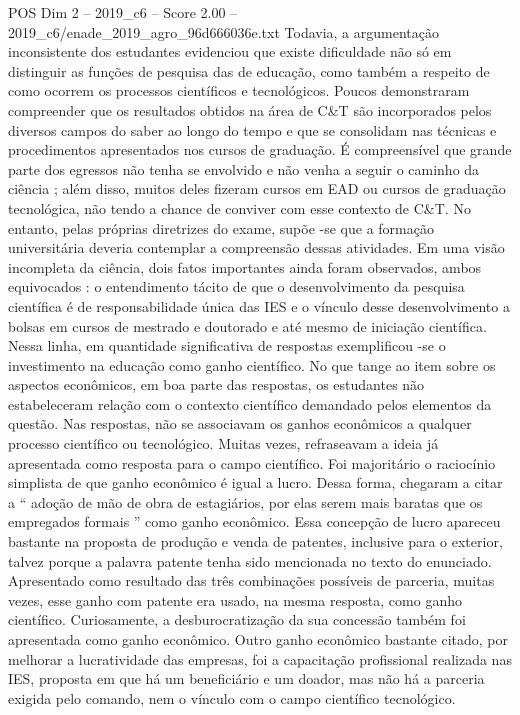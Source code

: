 \begin{textsample}{POS Dim 2 – 2019\_c6 – Score 2.00 – 2019\_c6/enade\_2019\_agro\_96d666036e.txt}
Todavia, a argumentação inconsistente dos estudantes evidenciou que existe dificuldade não só em distinguir as funções de pesquisa das de educação, como também a respeito de como ocorrem os processos científicos e tecnológicos.
Poucos demonstraram compreender que os resultados obtidos na área de C\&T são incorporados pelos diversos campos do saber ao longo do tempo e que se consolidam nas técnicas e procedimentos apresentados nos cursos de graduação.
É compreensível que grande parte dos egressos não tenha se envolvido e não venha a seguir o caminho da ciência ; além disso, muitos deles fizeram cursos em EAD ou cursos de graduação tecnológica, não tendo a chance de conviver com esse contexto de C\&T.
No entanto, pelas próprias diretrizes do exame, supõe -se que a formação universitária deveria contemplar a compreensão dessas atividades.
Em uma visão incompleta da ciência, dois fatos importantes ainda foram observados, ambos equivocados : o entendimento tácito de que o desenvolvimento da pesquisa científica é de responsabilidade única das IES e o vínculo desse desenvolvimento a bolsas em cursos de mestrado e doutorado e até mesmo de iniciação científica.
Nessa linha, em quantidade significativa de respostas exemplificou -se o investimento na educação como ganho científico.
No que tange ao item sobre os aspectos econômicos, em boa parte das respostas, os estudantes não estabeleceram relação com o contexto científico demandado pelos elementos da questão.
Nas respostas, não se associavam os ganhos econômicos a qualquer processo científico ou tecnológico.
Muitas vezes, refraseavam a ideia já apresentada como resposta para o campo científico.
Foi majoritário o raciocínio simplista de que ganho econômico é igual a lucro.
Dessa forma, chegaram a citar a “ adoção de mão de obra de estagiários, por elas serem mais baratas que os empregados formais ” como ganho econômico.
Essa concepção de lucro apareceu bastante na proposta de produção e venda de patentes, inclusive para o exterior, talvez porque a palavra patente tenha sido mencionada no texto do enunciado.
Apresentado como resultado das três combinações possíveis de parceria, muitas vezes, esse ganho com patente era usado, na mesma resposta, como ganho científico.
Curiosamente, a desburocratização da sua concessão também foi apresentada como ganho econômico.
Outro ganho econômico bastante citado, por melhorar a lucratividade das empresas, foi a capacitação profissional realizada nas IES, proposta em que há um beneficiário e um doador, mas não há a parceria exigida pelo comando, nem o vínculo com o campo científico tecnológico.

\end{textsample}
